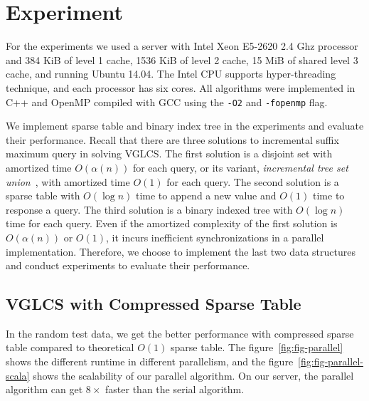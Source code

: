 \section{Experiment}
\label{sec:Experiment}

For the experiments we used a server with Intel Xeon E5-2620 2.4 Ghz
processor and 384 KiB of level 1 cache, 1536 KiB of level 2 cache, 15
MiB of shared level 3 cache, and running Ubuntu 14.04.  The Intel CPU
supports hyper-threading technique, and each processor has six cores.
All algorithms were implemented in C++ and OpenMP compiled with GCC
using the {\tt -O2} and {\tt -fopenmp} flag.

\iffalse
我們運行在 Intel Xeon E5-2620 2.40 GHz 主機上，其擁有 L1 cache 384 KiB、L2 cache 1536 KiB 和 L3 cache 15 MiB，
Intel CPU 同時也支持 hyper-threading 技術，每個處理器有 6 個實體核心。
所有的演算法使用 C++ 和 OpenMP 實作，使用優化參數為 \texttt{-O2} 和 \textt{-fopenmp}。
\fi



We implement sparse table and binary index tree in the experiments and
evaluate their performance.  Recall that there are three solutions to
incremental suffix maximum query in solving VGLCS.  The first solution
is a disjoint set with amortized time $O(\alpha(n))$ for each query,
or its variant, {\em incremental tree set union}~\cite{Gabow1983ALA},
with amortized time $O(1)$ for each query.  The second solution is a
sparse table with $O(\log n)$ time to append a new value and $O(1)$
time to response a query.  The third solution is a binary indexed tree
with $O(\log n)$ time for each query.  Even if the amortized
complexity of the first solution is $O(\alpha(n))$ or $O(1)$, it
incurs inefficient synchronizations in a parallel implementation.
Therefore, we choose to implement the last two data structures
and conduct experiments to evaluate their performance.

\subsection{VGLCS with Compressed Sparse Table}

In the random test data, we get the better performance with compressed
sparse table compared to theoretical $O(1)$ sparse table.  The
figure~\ref{fig:fig-parallel} shows the different runtime in different
parallelism, and the figure~\ref{fig:fig-parallel-scala} shows the scalability
of our parallel algorithm.  On our server, the parallel algorithm can
get $8 \times$ faster than the serial algorithm.


